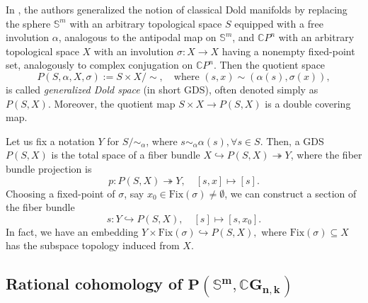 \documentclass{amsart}
\begin{document}
	In \cite{nath-sankaran, mandal-sankaran}, the authors generalized the notion of classical Dold manifolds by replacing the sphere $ \mathbb{S}^m $ with an arbitrary topological space $ S $ equipped with a free involution $ \alpha $, analogous to the antipodal map on $ \mathbb{S}^m $, and $ \mathbb CP^n $ with an arbitrary topological space $ X $ with an involution $ \sigma: X \to X $ having a nonempty fixed-point set, analogously to complex conjugation on $\mathbb CP^n$. Then the quotient space  
	\begin{equation}\label{gen dold space}
		P(S, \alpha, X, \sigma) := S \times X / \!\! \sim, \quad \text{where } (s, x) \sim (\alpha(s), \sigma(x)), 
	\end{equation}  
	is called \textit{generalized Dold space} (in short GDS), often denoted simply as $ P(S, X) $. Moreover, the quotient map  
	$ S \times X \to P(S,X) $  
	is a double covering map. %
	
	Let us fix a notation $ Y $ for $ S/\!\!\sim_{\alpha} $, where $ s\sim_{\alpha} \alpha(s), \forall s\in S $. Then, a GDS $ P(S,X) $ is the total space of a fiber bundle  
	$X\hookrightarrow P(S,X) \twoheadrightarrow Y $, where the fiber bundle projection is \begin{equation}\label{proj}
		p: P(S,X) \twoheadrightarrow Y, \quad [s,x]\mapsto [s].
	\end{equation}  Choosing a fixed-point of $\sigma$, say $x_0\in \text{Fix}(\sigma)\neq \emptyset$, we can construct a section of the fiber bundle \begin{equation}\label{sectio}
		s: Y \hookrightarrow P(S,X), \quad [s]\mapsto [s,x_0].
	\end{equation}    
	In fact, we have an embedding  
	$Y\times \text{Fix}(\sigma)\hookrightarrow P(S,X),$  
	where $ \text{Fix}(\sigma) \subseteq X $ has the subspace topology induced from $ X $.
	
	
	
	
	
	
	\subsection{Rational cohomology of $\mathbf{P(\mathbb S^m,\mathbb CG_{n,k})}$} \label{gds}
	
\end{document}
